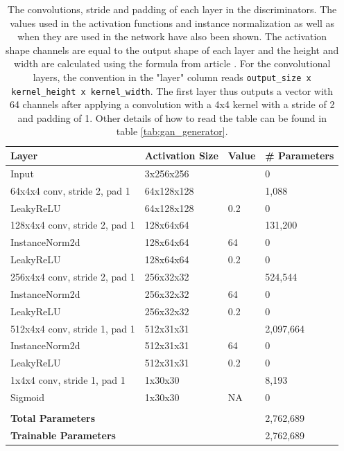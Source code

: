 \documentclass[11pt, fleqn, titlepage]{article}
\newcommand{\1}[1]{\mathds{1}\left[#1\right]}
\begin{document}
\begin{table}[H]
	\centering
	\begin{tabular}{llll}\toprule
		Layer                         & Activation Size & Value & \# Parameters \\ \midrule
		Input                         & 3x256x256       &       & 0             \\
		64x4x4 conv, stride 2, pad 1  & 64x128x128      &       & 1,088         \\
		LeakyReLU                     & 64x128x128      & 0.2   & 0             \\
		128x4x4 conv, stride 2, pad 1 & 128x64x64       &       & 131,200       \\
		InstanceNorm2d                & 128x64x64       & 64    & 0             \\
		LeakyReLU                     & 128x64x64       & 0.2   & 0             \\
		256x4x4 conv, stride 2, pad 1 & 256x32x32       &       & 524,544       \\
		InstanceNorm2d                & 256x32x32       & 64    & 0             \\
		LeakyReLU                     & 256x32x32       & 0.2   & 0             \\
		512x4x4 conv, stride 1, pad 1 & 512x31x31       &       & 2,097,664     \\
		InstanceNorm2d                & 512x31x31       & 64    & 0             \\
		LeakyReLU                     & 512x31x31       & 0.2   & 0             \\
		1x4x4 conv, stride 1, pad 1   & 1x30x30         &       & 8,193         \\
		Sigmoid                       & 1x30x30         & NA    & 0             \\
		                              &                 &       &               \\
		\textbf{Total Parameters}     &                 &       & 2,762,689     \\
		\textbf{Trainable Parameters} &                 &       & 2,762,689     \\ \bottomrule
	\end{tabular}
	\caption{The convolutions, stride and padding of each layer in the discriminators. The values used in the activation functions and instance normalization as well as when they are used in the network have also been shown. The activation shape channels are equal to the output shape of each layer and the height and width are calculated using the formula from article \protect\cite{calculate_activation_shape}. For the convolutional layers, the convention in the "layer" column reads \texttt{output\_size x kernel\_height x kernel\_width}. The first layer thus outputs a vector with 64 channels after applying a convolution with a 4x4 kernel with a stride of 2 and padding of 1. Other details of how to read the table can be found in table \ref{tab:gan_generator}.}
	\label{tab:discriminator_layers}
\end{table}
\end{document}
